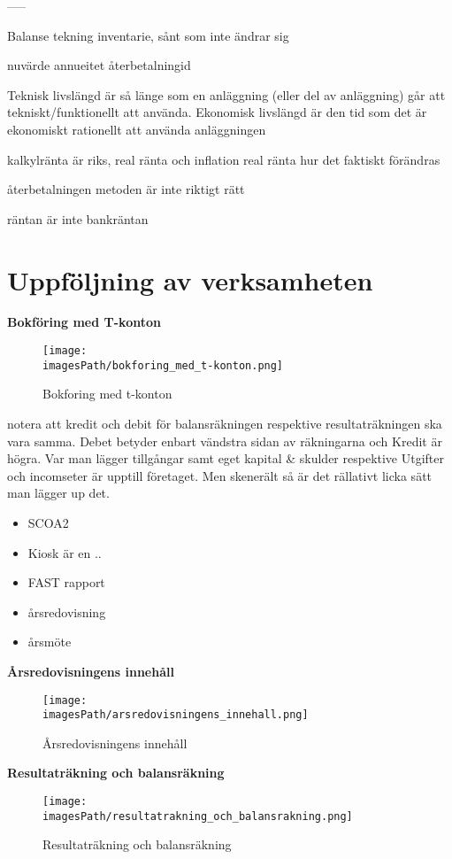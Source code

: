 -----

Balanse tekning
inventarie, sånt som inte ändrar sig

nuvärde
annueitet
återbetalningid

Teknisk livslängd är så länge som en anläggning (eller del av anläggning) går att tekniskt/funktionellt att använda. Ekonomisk livslängd är den tid som det är ekonomiskt rationellt att använda anläggningen


kalkylränta är riks, real ränta och inflation
real ränta hur det faktiskt förändras

återbetalningen metoden är inte riktigt rätt

räntan är inte bankräntan

\section{Uppföljning av verksamheten}

\textbf{Bokföring med T-konton}
\begin{figure}[!h]
    \centering
    \texttt{[image: \\imagesPath/bokforing\_med\_t-konton.png]}
    \caption{Bokforing med t-konton}
\end{figure}
notera att kredit och debit för balansräkningen respektive resultaträkningen ska vara samma.
Debet betyder enbart vändstra sidan av räkningarna och Kredit är högra.
Var man lägger tillgångar samt eget kapital \& skulder respektive Utgifter och incomseter är 
upptill företaget. Men skenerält så är det rällativt licka sätt man lägger up det.

\begin{itemize}
    \item SCOA2
    \item Kiosk är en ..
    \item FAST rapport
    \item årsredovisning
    \item årsmöte
\end{itemize}

\textbf{Årsredovisningens innehåll}
\begin{figure}[!h]
    \centering
    \texttt{[image: \\imagesPath/arsredovisningens\_innehall.png]}
    \caption{Årsredovisningens innehåll}
\end{figure}

\textbf{Resultaträkning och balansräkning}
\begin{figure}[!h]
    \centering
    \texttt{[image: \\imagesPath/resultatrakning\_och\_balansrakning.png]}
    \caption{Resultaträkning och balansräkning}
\end{figure}

